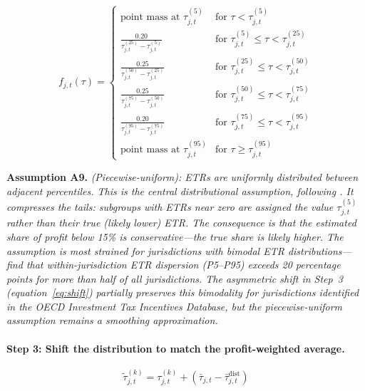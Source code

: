 \documentclass[11pt,a4paper]{article}
\newcommand{\assumption}[2]{\noindent\textbf{Assumption #1.} \textit{#2}\medskip}
\begin{document}
\begin{equation}\label{eq:piecewise}
f_{j,t}(\tau) = \begin{cases}
\text{point mass at } \tau_{j,t}^{(5)} & \text{for } \tau < \tau_{j,t}^{(5)} \\[4pt]
\frac{0.20}{\tau_{j,t}^{(25)} - \tau_{j,t}^{(5)}} & \text{for } \tau_{j,t}^{(5)} \leq \tau < \tau_{j,t}^{(25)} \\[4pt]
\frac{0.25}{\tau_{j,t}^{(50)} - \tau_{j,t}^{(25)}} & \text{for } \tau_{j,t}^{(25)} \leq \tau < \tau_{j,t}^{(50)} \\[4pt]
\frac{0.25}{\tau_{j,t}^{(75)} - \tau_{j,t}^{(50)}} & \text{for } \tau_{j,t}^{(50)} \leq \tau < \tau_{j,t}^{(75)} \\[4pt]
\frac{0.20}{\tau_{j,t}^{(95)} - \tau_{j,t}^{(75)}} & \text{for } \tau_{j,t}^{(75)} \leq \tau < \tau_{j,t}^{(95)} \\[4pt]
\text{point mass at } \tau_{j,t}^{(95)} & \text{for } \tau \geq \tau_{j,t}^{(95)}
\end{cases}
\end{equation}

\assumption{A9}{(Piecewise-uniform): ETRs are uniformly distributed between adjacent percentiles. This is the central distributional assumption, following \citet{hugger2026}. It compresses the tails: subgroups with ETRs near zero are assigned the value $\tau_{j,t}^{(5)}$ rather than their true (likely lower) ETR. The consequence is that the estimated share of profit below 15\% is \emph{conservative}---the true share is likely higher. The assumption is most strained for jurisdictions with bimodal ETR distributions---\citet{hugger2026} find that within-jurisdiction ETR dispersion (P5--P95) exceeds 20 percentage points for more than half of all jurisdictions. The asymmetric shift in Step~3 (equation~\eqref{eq:shift}) partially preserves this bimodality for jurisdictions identified in the OECD Investment Tax Incentives Database, but the piecewise-uniform assumption remains a smoothing approximation.}

\paragraph{Step 3: Shift the distribution to match the profit-weighted average.}

\begin{equation}\label{eq:shift}
\tilde{\tau}_{j,t}^{(k)} = \tau_{j,t}^{(k)} + \left(\bar{\tau}_{j,t} - \bar{\tau}_{j,t}^{\text{dist}}\right)
\end{equation}
\end{document}
